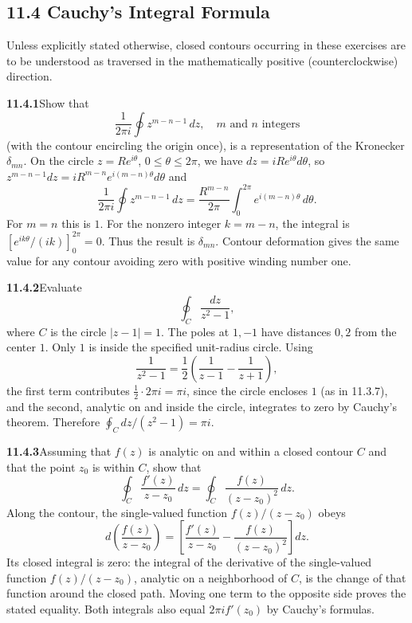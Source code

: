 \subsection*{11.4 Cauchy's Integral Formula}

Unless explicitly stated otherwise, closed contours occurring in these
exercises are to be understood as traversed in the mathematically positive
(counterclockwise) direction.

\par\bigskip
\noindent\textbf{11.4.1}\quad Show that
\[
\frac{1}{2\pi i}\oint z^{m-n-1}\,dz,\quad m\text{ and }n\text{ integers}
\]
(with the contour encircling the origin once), is a representation of the
Kronecker $\delta_{mn}$.
\solution
On the circle $z=Re^{i\theta}$, $0\le\theta\le2\pi$, we have
$dz=iRe^{i\theta}d\theta$, so
$z^{m-n-1}dz=iR^{m-n}e^{i(m-n)\theta}d\theta$ and
\[
\frac1{2\pi i}\oint z^{m-n-1}\,dz
=\frac{R^{m-n}}{2\pi}\int_0^{2\pi}e^{i(m-n)\theta}\,d\theta.
\]
For $m=n$ this is $1$.
For the nonzero integer $k=m-n$, the integral is
$[e^{ik\theta}/(ik)]_0^{2\pi}=0$.
Thus the result is $\boxed{\delta_{mn}}$.
Contour deformation gives the same value for any contour avoiding
zero with positive winding number one.

\par\bigskip
\noindent\textbf{11.4.2}\quad Evaluate
\[
\oint_{C}\frac{dz}{z^{2}-1},
\]
where $C$ is the circle $|z-1|=1$.
\solution
The poles at $1,-1$ have distances $0,2$ from the center $1$.
Only $1$ is inside the specified unit-radius circle.
Using
\[
\frac1{z^2-1}=\frac12\left(\frac1{z-1}-\frac1{z+1}\right),
\]
the first term contributes $\tfrac12\cdot2\pi i=\pi i$, since the circle
encloses $1$ (as in 11.3.7), and the second, analytic on and inside the
circle, integrates to zero by Cauchy's theorem.
Therefore $\boxed{\oint_C dz/(z^2-1)=\pi i}$.

\par\bigskip
\noindent\textbf{11.4.3}\quad Assuming that $f(z)$ is analytic on and within a
closed contour $C$ and that the point $z_{0}$ is within $C$, show that
\[
\oint_{C}\frac{f'(z)}{z-z_{0}}\,dz
=\oint_{C}\frac{f(z)}{(z-z_{0})^{2}}\,dz.
\]
\solution
Along the contour, the single-valued function $f(z)/(z-z_0)$ obeys
\[
d\left(\frac{f(z)}{z-z_0}\right)
=\left[\frac{f'(z)}{z-z_0}-\frac{f(z)}{(z-z_0)^2}\right]dz.
\]
Its closed integral is zero: the integral of the derivative of the
single-valued function $f(z)/(z-z_0)$, analytic on a neighborhood of
$C$, is the change of that function around the closed path. Moving one
term to the opposite side proves the stated equality. Both integrals also equal
$2\pi i f'(z_0)$ by Cauchy's formulas.

